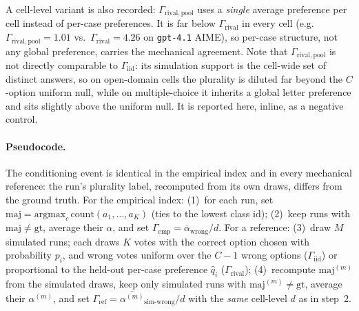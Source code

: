 \documentclass[a4paper,fleqn]{cas-sc}
\newcommand{\agreementIndex}{\Gamma}
\begin{document}
A cell-level variant is also recorded: $\agreementIndex_{\mathrm{rival,pool}}$
uses a \emph{single} average preference per cell instead of per-case
preferences. It is far below $\agreementIndex_{\mathrm{rival}}$ in every cell
(e.g.\ $\agreementIndex_{\mathrm{rival,pool}}=1.01$ vs.\ $\agreementIndex_{\mathrm{rival}}=4.26$
on \texttt{gpt-4.1} AIME), so per-case structure, not any
global preference, carries the mechanical agreement. Note that
$\agreementIndex_{\mathrm{rival,pool}}$ is not directly comparable to
$\agreementIndex_{\mathrm{iid}}$: its simulation support is the cell-wide set of
distinct answers, so on open-domain cells the plurality is diluted far
beyond the $C$-option uniform null, while on multiple-choice it inherits
a global letter preference and sits slightly above the uniform null. It is reported here, inline, as a negative control.

\paragraph{Pseudocode.}
\label{alg:kappa}
The conditioning event is identical in the empirical index and in every
mechanical reference: the run's plurality label, recomputed from its own
draws, differs from the ground truth. For the empirical index:
(1)~for each run, set $\mathrm{maj}=\mathrm{argmax}_c\,
\mathrm{count}(a_1,\dots,a_K)$ (ties to the lowest class id); (2)~keep
runs with $\mathrm{maj}\ne\mathrm{gt}$, average their $\alpha$, and set
$\agreementIndex_{\mathrm{emp}}=\overline{\alpha}_{\text{wrong}}/d$. For a
reference: (3)~draw $M$ simulated runs; each draws $K$ votes with the
correct option chosen with probability $p_i$, and wrong votes uniform
over the $C-1$ wrong options ($\agreementIndex_{\mathrm{iid}}$) or proportional to
the held-out per-case preference $\hat q_i$
($\agreementIndex_{\mathrm{rival}}$); (4)~recompute
$\mathrm{maj}^{(m)}$ from the simulated draws, keep only simulated runs
with $\mathrm{maj}^{(m)}\ne\mathrm{gt}$, average their $\alpha^{(m)}$,
and set $\agreementIndex_{\mathrm{ref}}=\overline{\alpha^{(m)}}_{\text{sim-wrong}}/d$
with the \emph{same} cell-level $d$ as in step~2.
\end{document}

